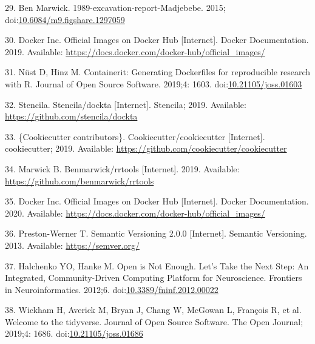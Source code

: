 \documentclass[10pt,letterpaper]{article}
\begin{document}
\leavevmode\hypertarget{ref-marwick_madjebebe_2015}{}%
29. Ben Marwick. 1989-excavation-report-Madjebebe. 2015;
doi:\href{https://doi.org/10.6084/m9.figshare.1297059}{10.6084/m9.figshare.1297059}

\leavevmode\hypertarget{ref-docker_inc_official_2019}{}%
30. Docker Inc. Official Images on Docker Hub {[}Internet{]}. Docker
Documentation. 2019. Available:
\url{https://docs.docker.com/docker-hub/official_images/}

\leavevmode\hypertarget{ref-nust_containerit_2019}{}%
31. Nüst D, Hinz M. Containerit: Generating Dockerfiles for reproducible
research with R. Journal of Open Source Software. 2019;4: 1603.
doi:\href{https://doi.org/10.21105/joss.01603}{10.21105/joss.01603}

\leavevmode\hypertarget{ref-stencila_dockta_2019}{}%
32. Stencila. Stencila/dockta {[}Internet{]}. Stencila; 2019. Available:
\url{https://github.com/stencila/dockta}

\leavevmode\hypertarget{ref-cookiecutter_contributors_cookiecutter_2019}{}%
33. \{Cookiecutter contributors\}. Cookiecutter/cookiecutter
{[}Internet{]}. cookiecutter; 2019. Available:
\url{https://github.com/cookiecutter/cookiecutter}

\leavevmode\hypertarget{ref-marwick_rrtools_2019}{}%
34. Marwick B. Benmarwick/rrtools {[}Internet{]}. 2019. Available:
\url{https://github.com/benmarwick/rrtools}

\leavevmode\hypertarget{ref-docker_inc_official_2020}{}%
35. Docker Inc. Official Images on Docker Hub {[}Internet{]}. Docker
Documentation. 2020. Available:
\url{https://docs.docker.com/docker-hub/official_images/}

\leavevmode\hypertarget{ref-preston-werner_semantic_2013}{}%
36. Preston-Werner T. Semantic Versioning 2.0.0 {[}Internet{]}. Semantic
Versioning. 2013. Available: \url{https://semver.org/}

\leavevmode\hypertarget{ref-halchenko_open_2012}{}%
37. Halchenko YO, Hanke M. Open is Not Enough. Let's Take the Next Step:
An Integrated, Community-Driven Computing Platform for Neuroscience.
Frontiers in Neuroinformatics. 2012;6.
doi:\href{https://doi.org/10.3389/fninf.2012.00022}{10.3389/fninf.2012.00022}

\leavevmode\hypertarget{ref-Wickham2019}{}%
38. Wickham H, Averick M, Bryan J, Chang W, McGowan L, François R, et
al. Welcome to the tidyverse. Journal of Open Source Software. The Open
Journal; 2019;4: 1686.
doi:\href{https://doi.org/10.21105/joss.01686}{10.21105/joss.01686}
\end{document}
